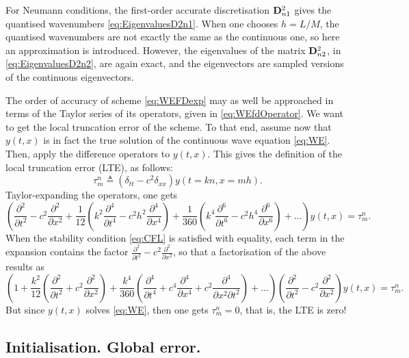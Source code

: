 \documentclass[11pt,twoside,a4paper,english]{book}
\newcommand{\dss}{\delta_{xx}}
\newcommand{\dtt}{\delta_{tt}}
\begin{document}
For Neumann conditions, the first-order accurate discretisation ${\bf D}^2_{n1}$ gives the quantised wavenumbers \eqref{eq:EigenvaluesD2n1}. When one chooses $h = L/M$, the quantised wavenumbers are not exactly the same as the continuous one, so here an approximation is introduced. However, the eigenvalues of the matrix ${\bf D}^2_{n2}$, in \eqref{eq:EigenvaluesD2n2}, are again exact, and the eigenvectors are sampled versions of the continuous eigenvectors.


The order of accuracy of scheme \eqref{eq:WEFDexp} may as well be approached in terms of the Taylor series of its operators, given in \eqref{eq:WEfdOperator}. We want to get the local truncation error of the scheme. To that end, assume now that $y(t,x)$ is in fact the true solution of the continuous wave equation \eqref{eq:WE}. Then, apply the difference operators to $y(t,x)$. This gives the definition of the local truncation error (LTE), as follows:
\begin{equation}
\tau^n_m \triangleq (\dtt - c^2 \dss)y(t=kn,x=mh).
\end{equation}
Taylor-expanding the operators, one gets
\begin{equation}
\left(\frac{\partial^2}{\partial t^2} - c^2 \frac{\partial^2}{\partial x^2} + \frac{1}{12}\left(k^2 \frac{\partial^4}{\partial t^4} - c^2 h^2 \frac{\partial^4}{\partial x^4}\right) + \frac{1}{360}\left(k^4 \frac{\partial^6}{\partial t^6} - c^2 h^4 \frac{\partial^6}{\partial x^6}\right) + ... \right)y(t,x) = \tau^n_m.
\end{equation}
When the stability condition \eqref{eq:CFL} is satisfied with equality, each term in the expansion contains the factor $\frac{\partial^2}{\partial t^2} - c^2 \frac{\partial^2}{\partial x^2}$, so that a factorisation of the above results as
\begin{equation}
\left(1 + \frac{k^2}{12}\left(\frac{\partial^2}{\partial t^2} + c^2 \frac{\partial^2}{\partial x^2}\right) + \frac{k^4}{360}\left( \frac{\partial^4}{\partial t^4} + c^4 \frac{\partial^4}{\partial x^4} +c^2 \frac{\partial^4}{\partial x^2 \partial t^2} \right) + ... \right)\left(\frac{\partial^2}{\partial t^2} - c^2 \frac{\partial^2}{\partial x^2}\right) y(t,x) = \tau^n_m.
\end{equation}
But since $y(t,x)$ solves \eqref{eq:WE}, then one gets $\tau^n_m=0$, that is, the LTE is zero!  




\subsection{Initialisation. Global error. }
\end{document}
